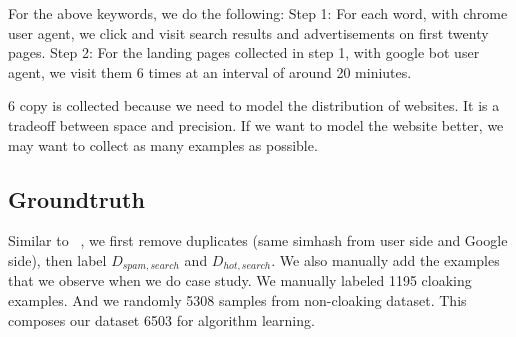 For the above keywords, we do the following:
Step 1: For each word, with chrome user agent, we click and visit search results and advertisements on first
twenty pages.
Step 2: For the landing pages collected in step 1, with google bot user agent, we visit them 6 times at an
interval of around 20 miniutes.

6 copy is collected because we need to model the distribution of websites. It is
a tradeoff between space and precision. If we want to model the website better,
we may want to collect as many examples as possible.


\subsection{Groundtruth}

Similar to ~\cite{lin2009detection}, we first remove duplicates (same simhash
from user side and Google side), then label $D_{spam, search}$ and $D_{hot,
search}$. We also manually add the examples that we observe when we do case
study. We manually labeled 1195 cloaking examples. And we randomly
 5308 samples from non-cloaking dataset. This composes our
dataset 6503 for algorithm learning.

%
%
%
%




%
%
%
%

